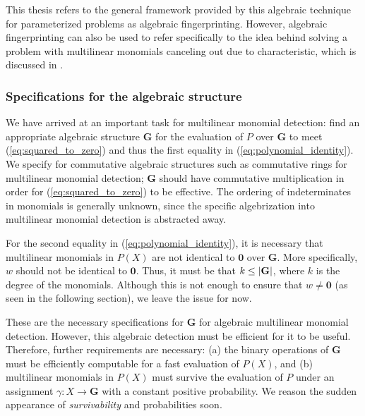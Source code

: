 This thesis refers to the general framework provided 
by this algebraic technique for parameterized problems \cite{KouWil09, KouWil15} as 
algebraic fingerprinting. However, algebraic fingerprinting can also 
be used to refer specifically to the idea behind solving a problem 
with multilinear monomials canceling out due to characteristic,  
which is discussed in .

\subsubsection{Specifications for the algebraic structure}
\label{sect:algebra_specs}

We have arrived at an important task for multilinear monomial detection: 
find an appropriate algebraic structure $\mathbf{G}$ for 
the evaluation of $P$ over $\mathbf{G}$ to meet 
(\ref{eq:squared_to_zero}) and thus the first equality in (\ref{eq:polynomial_identity}). 
We specify for commutative algebraic structures such as 
commutative rings for multilinear monomial detection; 
$\mathbf{G}$ should have commutative multiplication in order for (\ref{eq:squared_to_zero}) 
to be effective. The ordering of indeterminates in monomials is generally unknown, 
since the specific algebrization into multilinear monomial detection 
is abstracted away. %

For the second equality in (\ref{eq:polynomial_identity}), it is necessary that multilinear 
monomials in $P(X)$ are not identical to $\mathbf{0}$ over $\mathbf{G}$. 
More specifically, 
$w$ should not be identical to $\mathbf{0}$. 
Thus, it must be that $k \leq {\left\vert\mathbf{G}\right\vert}$, where $k$ is the degree of the monomials. 
Although this is not enough to ensure that $w \neq \mathbf{0}$ (as seen in the following section), 
we leave the issue for now.

These are the necessary specifications for $\mathbf{G}$ for algebraic multilinear monomial detection. 
However, this algebraic detection must be efficient for it to be useful. 
Therefore, further requirements are necessary: (a) the binary operations of $\mathbf{G}$ 
must be efficiently computable 
for a fast evaluation of $P(X)$, and (b) multilinear monomials in $P(X)$ must 
survive the evaluation of $P$ under an assignment $\gamma \colon X \to \mathbf{G}$ 
with a constant positive probability. We reason the 
sudden appearance of \emph{survivability} and probabilities soon.

